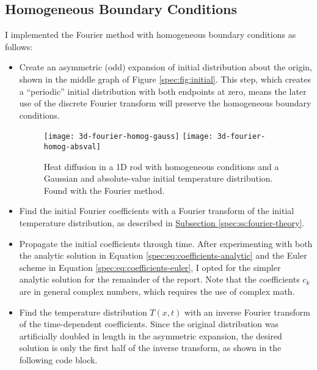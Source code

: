 \documentclass[11pt, a4paper]{article}
\begin{document}
\subsection{Homogeneous Boundary Conditions}
I implemented the Fourier method with homogeneous boundary conditions as follows:
\begin{itemize}
	\item Create an asymmetric (odd) expansion of initial distribution about the origin, shown in the middle graph of Figure \ref{spec:fig:initial}. This step, which creates a ``periodic'' initial distribution with both endpoints at zero, means the later use of the discrete Fourier transform will preserve the homogeneous boundary conditions.
	
\begin{figure}
\centering
\texttt{[image: 3d-fourier-homog-gauss]} \hfill
\texttt{[image: 3d-fourier-homog-absval]}
\caption{Heat diffusion in a 1D rod with homogeneous conditions and a Gaussian and absolute-value initial temperature distribution. Found with the Fourier method.}
\label{spec:fig:3d-fourier-homog}
\end{figure}	
	
	\item Find the initial Fourier coefficients with a Fourier transform of the initial temperature distribution, as described in \hyperref[spec:ss:fourier-theory]{Subsection \ref{spec:ss:fourier-theory}}. 
	
	\item Propagate the initial coefficients through time. After experimenting with both the analytic solution in Equation \ref{spec:eq:coefficients-analytic} and the Euler scheme in Equation \ref{spec:eq:coefficients-euler}, I opted for the simpler analytic solution for the remainder of the report. Note that the coefficients $ c_{k} $ are in general complex numbers, which requires the use of complex math.
	
	\item Find the temperature distribution $ T(x, t) $ with an inverse Fourier transform of the time-dependent coefficients. Since the original distribution was artificially doubled in length in the asymmetric expansion, the desired solution is only the first half of the inverse transform, as shown in the following code block.

\end{itemize}
\end{document}

